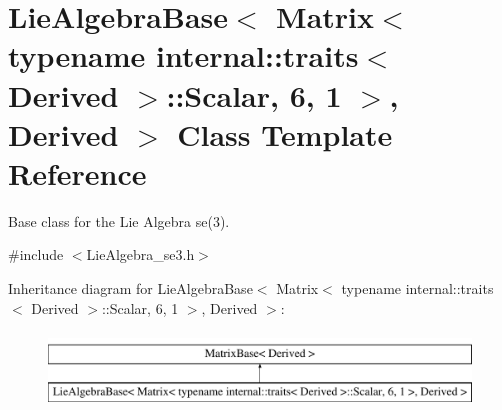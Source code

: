 \hypertarget{class_lie_algebra_base_3_01_matrix_3_01typename_01internal_1_1traits_3_01_derived_01_4_1_1_scala449314c781550590437697c4dc21a6d4}{}\section{Lie\+Algebra\+Base$<$ Matrix$<$ typename internal\+:\+:traits$<$ Derived $>$\+:\+:Scalar, 6, 1 $>$, Derived $>$ Class Template Reference}
\label{class_lie_algebra_base_3_01_matrix_3_01typename_01internal_1_1traits_3_01_derived_01_4_1_1_scala449314c781550590437697c4dc21a6d4}


Base class for the Lie Algebra se(3).  




{\ttfamily \#include $<$Lie\+Algebra\+\_\+se3.\+h$>$}

Inheritance diagram for Lie\+Algebra\+Base$<$ Matrix$<$ typename internal\+:\+:traits$<$ Derived $>$\+:\+:Scalar, 6, 1 $>$, Derived $>$\+:\begin{figure}[H]
\begin{center}
\leavevmode
\includegraphics[height=2.000000cm]{class_lie_algebra_base_3_01_matrix_3_01typename_01internal_1_1traits_3_01_derived_01_4_1_1_scala449314c781550590437697c4dc21a6d4}
\end{center}
\end{figure}
